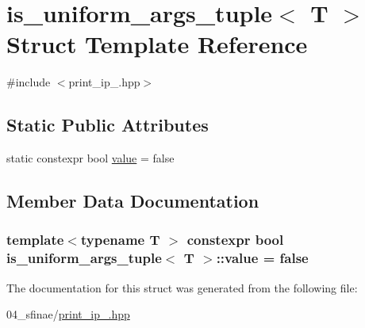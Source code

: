 \hypertarget{structis__uniform__args__tuple}{}\section{is\+\_\+uniform\+\_\+args\+\_\+tuple$<$ T $>$ Struct Template Reference}
\label{structis__uniform__args__tuple}


{\ttfamily \#include $<$print\+\_\+ip\+\_.\+hpp$>$}

\subsection*{Static Public Attributes}
\begin{DoxyCompactItemize}
\item 
static constexpr bool \hyperlink{structis__uniform__args__tuple_aba27a26a86e08bf76efee3fa4198b699}{value} = false
\end{DoxyCompactItemize}


\subsection{Member Data Documentation}
\subsubsection[{\texorpdfstring{value}{value}}]{\setlength{\rightskip}{0pt plus 5cm}template$<$typename T $>$ constexpr bool {\bf is\+\_\+uniform\+\_\+args\+\_\+tuple}$<$ T $>$\+::value = false\hspace{0.3cm}{\ttfamily [static]}}\hypertarget{structis__uniform__args__tuple_aba27a26a86e08bf76efee3fa4198b699}{}\label{structis__uniform__args__tuple_aba27a26a86e08bf76efee3fa4198b699}


The documentation for this struct was generated from the following file\+:\begin{DoxyCompactItemize}
\item 
04\+\_\+sfinae/\hyperlink{print__ip__04_8hpp}{print\+\_\+ip\+\_.\+hpp}\end{DoxyCompactItemize}
